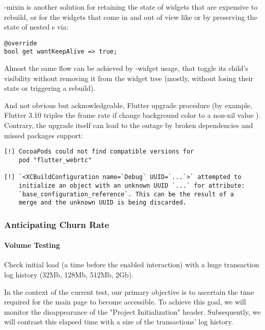 -mixin is another solution for retaining the state of widgets that are expensive to 
rebuild, or for the widgets that come in and out of view like  or  by preserving the state of
nested s via:

\begin{lstlisting}
@override
bool get wantKeepAlive => true;
\end{lstlisting}

\noindent Almost the same flow can be achieved by -widget usage, that toggle its child's visibility without 
removing it from the widget tree (mostly, without losing their state or triggering a rebuild).

And not obvious but acknowledgeable, Flutter upgrade procedure (by example, Flutter 3.10 triples the frame rate if 
change  background color to a non-nil value \cite{Chis23}). Contrary, the upgrade itself can lead to 
the outage by broken dependencies and missed packages support:

\begin{lstlisting}
[!] CocoaPods could not find compatible versions for 
    pod "flutter_webrtc"

[!] `<XCBuildConfiguration name=`Debug` UUID=`...`>` attempted to 
    initialize an object with an unknown UUID `...` for attribute: 
    `base_configuration_reference`. This can be the result of a 
    merge and the unknown UUID is being discarded.
\end{lstlisting}


\subsubsection{Anticipating Churn Rate}
\paragraph{Volume Testing}
Check initial load (a time before the enabled interaction) with a huge transaction log history (32Mb, 128Mb, 
512Mb, 2Gb).

In the context of the current test, our primary objective is to ascertain the time required for the main page to 
become accessible. To achieve this goal, we will monitor the disappearance of the "Project Initialization" header. 
Subsequently, we will contrast this elapsed time with a size of the transactions' log history.

